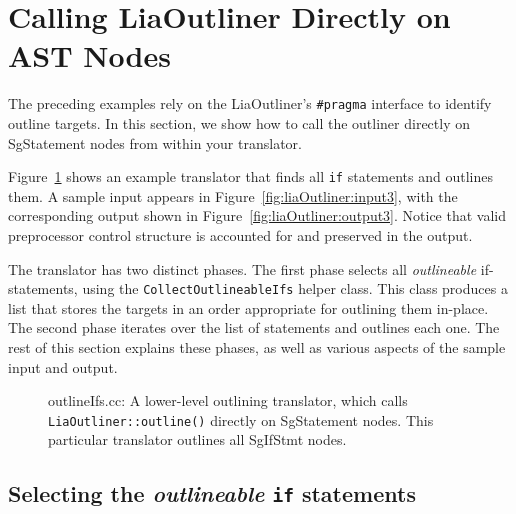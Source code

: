 \section{Calling LiaOutliner Directly on AST Nodes}
\label{sec:liaOutliner:direct}

The preceding examples rely on the LiaOutliner's \texttt{\#pragma}
interface to identify outline targets. In this section, we show how
to call the outliner directly on SgStatement nodes from within your
translator.

Figure~\ref{fig:liaOutliner:direct} shows an example translator that
finds all \texttt{if} statements and outlines them. A sample input
appears in Figure~\ref{fig:liaOutliner:input3}, with the corresponding
output shown in Figure~\ref{fig:liaOutliner:output3}. Notice that
valid preprocessor control structure is accounted for and preserved in
the output.

The translator has two distinct phases. The first phase selects all
\emph{outlineable} if-statements, using the
\texttt{CollectOutlineableIfs} helper class. This class produces a
list that stores the targets in an order appropriate for outlining
them in-place. The second phase iterates over the list of statements
and outlines each one. The rest of this section explains these phases,
as well as various aspects of the sample input and output.

\begin{figure}[!h]
{\indent
{\mySmallFontSize
\begin{latexonly}
   
\end{latexonly}
\begin{htmlonly}
   
\end{htmlonly}

}
}
\caption{outlineIfs.cc: A lower-level outlining translator, which
calls \texttt{LiaOutliner::outline()} directly on SgStatement
nodes. This particular translator outlines all SgIfStmt nodes.}
\label{fig:liaOutliner:direct}
\end{figure}

\subsection{Selecting the \emph{outlineable} \texttt{if} statements}
\label{sec:liaOutliner:direct:translator}

